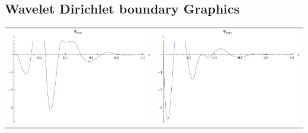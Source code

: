 \documentclass{article}
\begin{document}
\begin{landscape}
\subsection{Wavelet Dirichlet boundary Graphics}
\begin{tabular}{cc}
\includegraphics[width=10.cm]{cubic_wavelet_dleft_1.pdf}& \includegraphics[width=10.cm]{cubic_wavelet_dleft_2.pdf} \\
\end{tabular} 
 \\ 
\begin{tabular}{cc}

\end{tabular}
\end{landscape}
\end{document}

